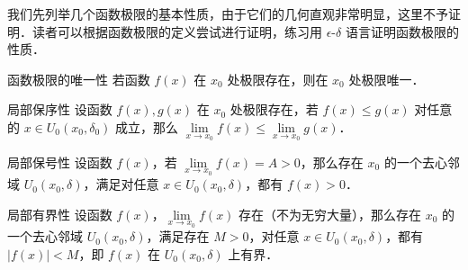 

我们先列举几个函数极限的基本性质，由于它们的几何直观非常明显，这里不予证明．读者可以根据函数极限的定义尝试进行证明，练习用 $\epsilon$-$\delta$ 语言证明函数极限的性质．
\begin{theorem}{函数极限的唯一性}
  若函数 $f(x)$ 在 $x_0$ 处极限存在，则在 $x_0$ 处极限唯一．
\end{theorem}
\begin{theorem}{局部保序性}
设函数 $f(x),g(x)$ 在 $x_0$ 处极限存在，若 $f(x)\le g(x)$ 对任意的 $x\in U_0(x_0,\delta_0)$ 成立，那么 $\lim\limits_{x\rightarrow x_0} f(x)\le \lim\limits_{x\rightarrow x_0}g(x)$．
\end{theorem}
\begin{theorem}{局部保号性}
设函数 $f(x)$，若 $\lim\limits_{x\rightarrow x_0}f(x)=A>0$，那么存在 $x_0$ 的一个去心邻域 $U_0(x_0,\delta)$，满足对任意 $x\in U_0(x_0,\delta)$，都有 $f(x)>0$．
\end{theorem}
\begin{theorem}{局部有界性}
设函数 $f(x)$，$\lim\limits_{x\rightarrow x_0}f(x)$ 存在（不为无穷大量），那么存在 $x_0$ 的一个去心邻域  $U_0(x_0,\delta)$，满足存在 $M>0$，对任意 $x\in U_0(x_0,\delta)$，都有 $|f(x)|<M$，即 $f(x)$ 在 $U_0(x_0,\delta)$ 上有界．
\end{theorem}
